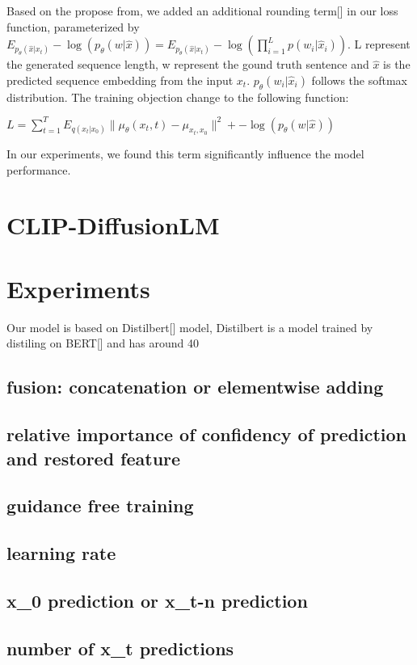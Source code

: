 \documentclass{article}
\begin{document}
Based on the propose from, we added an additional rounding term[] in our loss function, parameterized by $E_{p_{\theta}(\hat{x} | x_t)}-\log(p_{\theta}(w | \hat{x})) = E_{p_{\theta}(\hat{x} | x_t)}-\log(\prod_{i=1}^L p(w_i | \hat{x}_i))$. L represent the generated sequence length, w represent the gound truth sentence and $\hat{x}$ is the predicted sequence embedding from the input $x_t$. $p_{\theta}(w_i | \hat{x}_i)$ follows the softmax distribution. The training objection change to the following function:

$L = \sum_{t=1}^T E_{q(x_t | x_0)} \|\mu_{\theta}(x_t, t) - \mu_{x_t, x_0}\|^2 + -\log(p_{\theta}(w | \hat{x}))$

In our experiments, we found this term significantly influence the model performance{}.

\section{CLIP-DiffusionLM}


\section{Experiments}
Our model is based on Distilbert[] model, Distilbert is a model trained by distiling on BERT[] and has around 40%

\subsection{fusion: concatenation or elementwise adding}

\subsection{relative importance of confidency of prediction and restored feature}
\subsection{guidance free training}
\subsection{learning rate}
\subsection{x_0 prediction or x_{t-n} prediction}
\subsection{number of x_t predictions}
\end{document}
